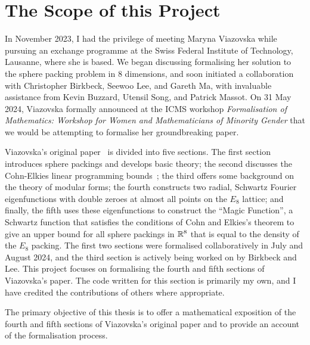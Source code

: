 \section{The Scope of this Project}


In November 2023, I had the privilege of meeting Maryna Viazovska while pursuing an exchange programme at the Swiss Federal Institute of Technology, Lausanne, where she is based. We began discussing formalising her solution to the sphere packing problem in $8$ dimensions, and soon initiated a collaboration with Christopher Birkbeck, Seewoo Lee, and Gareth Ma, with invaluable assistance from Kevin Buzzard, Utensil Song, and Patrick Massot. On 31 May 2024, Viazovska formally announced at the ICMS workshop \textit{Formalisation of Mathematics: Workshop for Women and Mathematicians of Minority Gender} that we would be attempting to formalise her groundbreaking paper.

Viazovska's original paper~\cite{Viazovska8} is divided into five sections. The first section introduces sphere packings and develops basic theory; the second discusses the Cohn-Elkies linear programming bounds~\cite[Theorem 3.1]{CohnElkies}; the third offers some background on the theory of modular forms; the fourth constructs two radial, Schwartz Fourier eigenfunctions with double zeroes at almost all points on the $E_8$ lattice; and finally, the fifth uses these eigenfunctions to construct the ``Magic Function'', a Schwartz function that satisfies the conditions of Cohn and Elkies's theorem to give an upper bound for all sphere packings in $\mathbb{R}^8$ that is equal to the density of the $E_8$ packing. The first two sections were formalised collaboratively in July and August 2024, and the third section is actively being worked on by Birkbeck and Lee. This project focuses on formalising the fourth and fifth sections of Viazovska's paper. The code written for this section is primarily my own, and I have credited the contributions of others where appropriate.

The primary objective of this thesis is to offer a mathematical exposition of the fourth and fifth sections of Viazovska's original paper and to provide an account of the formalisation process. 

